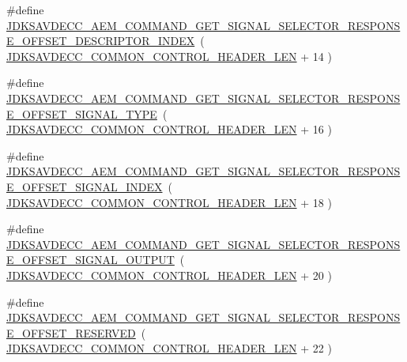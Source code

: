 \begin{DoxyCompactItemize}
\item 
\#define \hyperlink{group__command__get__signal__selector__response_gadaaeaae9a94dd20e84a10b7c0acc70cc}{J\+D\+K\+S\+A\+V\+D\+E\+C\+C\+\_\+\+A\+E\+M\+\_\+\+C\+O\+M\+M\+A\+N\+D\+\_\+\+G\+E\+T\+\_\+\+S\+I\+G\+N\+A\+L\+\_\+\+S\+E\+L\+E\+C\+T\+O\+R\+\_\+\+R\+E\+S\+P\+O\+N\+S\+E\+\_\+\+O\+F\+F\+S\+E\+T\+\_\+\+D\+E\+S\+C\+R\+I\+P\+T\+O\+R\+\_\+\+I\+N\+D\+EX}~( \hyperlink{group__jdksavdecc__avtp__common__control__header_gaae84052886fb1bb42f3bc5f85b741dff}{J\+D\+K\+S\+A\+V\+D\+E\+C\+C\+\_\+\+C\+O\+M\+M\+O\+N\+\_\+\+C\+O\+N\+T\+R\+O\+L\+\_\+\+H\+E\+A\+D\+E\+R\+\_\+\+L\+EN} + 14 )
\item 
\#define \hyperlink{group__command__get__signal__selector__response_ga46c0926dd1e38b31ca05c20787c645ca}{J\+D\+K\+S\+A\+V\+D\+E\+C\+C\+\_\+\+A\+E\+M\+\_\+\+C\+O\+M\+M\+A\+N\+D\+\_\+\+G\+E\+T\+\_\+\+S\+I\+G\+N\+A\+L\+\_\+\+S\+E\+L\+E\+C\+T\+O\+R\+\_\+\+R\+E\+S\+P\+O\+N\+S\+E\+\_\+\+O\+F\+F\+S\+E\+T\+\_\+\+S\+I\+G\+N\+A\+L\+\_\+\+T\+Y\+PE}~( \hyperlink{group__jdksavdecc__avtp__common__control__header_gaae84052886fb1bb42f3bc5f85b741dff}{J\+D\+K\+S\+A\+V\+D\+E\+C\+C\+\_\+\+C\+O\+M\+M\+O\+N\+\_\+\+C\+O\+N\+T\+R\+O\+L\+\_\+\+H\+E\+A\+D\+E\+R\+\_\+\+L\+EN} + 16 )
\item 
\#define \hyperlink{group__command__get__signal__selector__response_gac8ffe884ccd9a77b182d9d7862270487}{J\+D\+K\+S\+A\+V\+D\+E\+C\+C\+\_\+\+A\+E\+M\+\_\+\+C\+O\+M\+M\+A\+N\+D\+\_\+\+G\+E\+T\+\_\+\+S\+I\+G\+N\+A\+L\+\_\+\+S\+E\+L\+E\+C\+T\+O\+R\+\_\+\+R\+E\+S\+P\+O\+N\+S\+E\+\_\+\+O\+F\+F\+S\+E\+T\+\_\+\+S\+I\+G\+N\+A\+L\+\_\+\+I\+N\+D\+EX}~( \hyperlink{group__jdksavdecc__avtp__common__control__header_gaae84052886fb1bb42f3bc5f85b741dff}{J\+D\+K\+S\+A\+V\+D\+E\+C\+C\+\_\+\+C\+O\+M\+M\+O\+N\+\_\+\+C\+O\+N\+T\+R\+O\+L\+\_\+\+H\+E\+A\+D\+E\+R\+\_\+\+L\+EN} + 18 )
\item 
\#define \hyperlink{group__command__get__signal__selector__response_ga086c9ac6dbd4d27dd99c50e351f35856}{J\+D\+K\+S\+A\+V\+D\+E\+C\+C\+\_\+\+A\+E\+M\+\_\+\+C\+O\+M\+M\+A\+N\+D\+\_\+\+G\+E\+T\+\_\+\+S\+I\+G\+N\+A\+L\+\_\+\+S\+E\+L\+E\+C\+T\+O\+R\+\_\+\+R\+E\+S\+P\+O\+N\+S\+E\+\_\+\+O\+F\+F\+S\+E\+T\+\_\+\+S\+I\+G\+N\+A\+L\+\_\+\+O\+U\+T\+P\+UT}~( \hyperlink{group__jdksavdecc__avtp__common__control__header_gaae84052886fb1bb42f3bc5f85b741dff}{J\+D\+K\+S\+A\+V\+D\+E\+C\+C\+\_\+\+C\+O\+M\+M\+O\+N\+\_\+\+C\+O\+N\+T\+R\+O\+L\+\_\+\+H\+E\+A\+D\+E\+R\+\_\+\+L\+EN} + 20 )
\item 
\#define \hyperlink{group__command__get__signal__selector__response_gaed5d35726ca0cffa06c59da645873d89}{J\+D\+K\+S\+A\+V\+D\+E\+C\+C\+\_\+\+A\+E\+M\+\_\+\+C\+O\+M\+M\+A\+N\+D\+\_\+\+G\+E\+T\+\_\+\+S\+I\+G\+N\+A\+L\+\_\+\+S\+E\+L\+E\+C\+T\+O\+R\+\_\+\+R\+E\+S\+P\+O\+N\+S\+E\+\_\+\+O\+F\+F\+S\+E\+T\+\_\+\+R\+E\+S\+E\+R\+V\+ED}~( \hyperlink{group__jdksavdecc__avtp__common__control__header_gaae84052886fb1bb42f3bc5f85b741dff}{J\+D\+K\+S\+A\+V\+D\+E\+C\+C\+\_\+\+C\+O\+M\+M\+O\+N\+\_\+\+C\+O\+N\+T\+R\+O\+L\+\_\+\+H\+E\+A\+D\+E\+R\+\_\+\+L\+EN} + 22 )

\end{DoxyCompactItemize}
